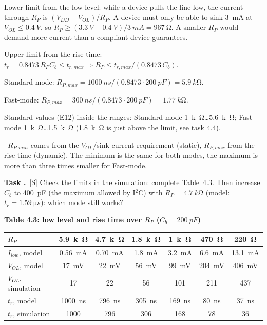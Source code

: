\documentclass[a4paper,11pt]{article}
\newcounter{task}[section]
\renewcommand{\thetask}{\thesection.\arabic{task}}
\newcommand{\task}[1]{\par\medskip\refstepcounter{task}%
  {\sffamily\bfseries\color{rwuviolet}Task \thetask}\ {\sffamily\small\color{rwucyandark}[#1]}\quad}
\newenvironment{solution}{\begin{solbox}}{\end{solbox}}
\newcommand{\answer}{\par\smallskip{\sffamily\bfseries\color{rwuviolet}Answer:}\ }
\newcommand{\simv}[1]{\textcolor{rwuviolet}{#1}}
\newcommand{\simv}[1]{}
\newenvironment{results}[2]{\par\smallskip\begin{center}\small\sffamily
  {\color{rwucyandark}\bfseries #1}\\[1mm]\renewcommand{\arraystretch}{1.25}\begin{tabular}{#2}\toprule}
  {\bottomrule\end{tabular}\end{center}}
\begin{document}
\begin{solution}
\begin{steps}
  \item Lower limit from the low level: while a device pulls the line low, the current through $R_P$ is
        $(V_{DD}-V_{OL})/R_P$. A device must only be able to sink \SI{3}{mA} at $V_{OL}\le\SI{0.4}{V}$, so
        $R_P\ge(\SI{3.3}{V}-\SI{0.4}{V})/\SI{3}{mA}=\SI{967}{\ohm}$. A smaller $R_P$ would demand more current
        than a compliant device guarantees.
  \item Upper limit from the rise time: $t_r=0.8473\,R_PC_b\le t_{r,max}\Rightarrow R_P\le t_{r,max}/(0.8473\,C_b)$.
  \item Standard-mode: $R_{P,max}=\SI{1000}{ns}/(0.8473\cdot\SI{200}{pF})=\SI{5.9}{k\ohm}$.
  \item Fast-mode: $R_{P,max}=\SI{300}{ns}/(0.8473\cdot\SI{200}{pF})=\SI{1.77}{k\ohm}$.
  \item Standard values (E12) inside the ranges: Standard-mode \SI{1}{k\ohm}\ldots\SI{5.6}{k\ohm}; Fast-mode
        \SI{1}{k\ohm}\ldots\SI{1.5}{k\ohm} (\SI{1.8}{k\ohm} is just above the limit, see task 4.4).
\end{steps}
\answer $R_{P,min}$ comes from the $V_{OL}$/sink current requirement (static), $R_{P,max}$ from the rise time
(dynamic). The minimum is the same for both modes, the maximum is more than three times smaller for Fast-mode.
\end{solution}

\task{S} Check the limits in the simulation: complete Table~4.3. Then increase $C_b$ to \SI{400}{pF} (the maximum
allowed by I$^2$C) with $R_P=\SI{4.7}{k\ohm}$ (model: $t_r=\SI{1.59}{\micro s}$): which mode still works?

\begin{results}{Table 4.3: low level and rise time over $R_P$ ($C_b=\SI{200}{pF}$)}{lcccccc}
  $R_P$ & \SI{5.9}{k\ohm} & \SI{4.7}{k\ohm} & \SI{1.8}{k\ohm} & \SI{1}{k\ohm} & \SI{470}{\ohm} & \SI{220}{\ohm}\\ \midrule
  $I_{low}$, model & \SI{0.56}{mA} & \SI{0.70}{mA} & \SI{1.8}{mA} & \SI{3.2}{mA} & \SI{6.6}{mA} & \SI{13.1}{mA}\\
  $V_{OL}$, model & \SI{17}{mV} & \SI{22}{mV} & \SI{56}{mV} & \SI{99}{mV} & \SI{204}{mV} & \SI{406}{mV}\\
  $V_{OL}$, simulation & \simv{17} & \simv{22} & \simv{56} & \simv{101} & \simv{211} & \simv{437}\\
  $t_r$, model & \SI{1000}{ns} & \SI{796}{ns} & \SI{305}{ns} & \SI{169}{ns} & \SI{80}{ns} & \SI{37}{ns}\\
  $t_r$, simulation & \simv{1000} & \simv{796} & \simv{306} & \simv{168} & \simv{78} & \simv{36}\\
\end{results}
\end{document}

